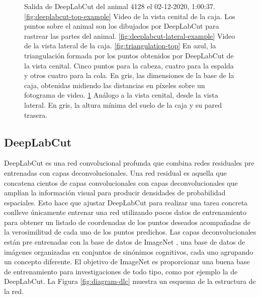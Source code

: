 \begin{figure}[p]
\begin{subfigure}{0.45\textwidth}
    \caption{}
    \label{fig:triangulation-lateral}
  \end{subfigure}
  \caption[Salida de DeepLabCut.]
  {Salida de DeepLabCut del animal 4128 el 02-12-2020, 1:00:37. \ref{fig:deeplabcut-top-example} Video de la vista cenital de la caja. Los puntos sobre el animal son los dibujados por DeepLabCut para rastrear las partes del animal. \ref{fig:deeplabcut-lateral-example} Video de la vista lateral de la caja. \ref{fig:triangulation-top} En azul, la triangulación formada por los puntos obtenidos por DeepLabCut de la vista cenital. Cinco puntos para la cabeza, cuatro para la espalda y otros cuatro para la cola. En gris, las dimensiones de la base de la caja, obtenidas midiendo las distancias en píxeles sobre un fotograma de video. \ref{fig:triangulation-lateral} Análogo a la vista cenital, desde la vista lateral. En gris, la altura mínima del suelo de la caja y su pared trasera.}

  \label{fig:deeplabcut-outputexamples}
\end{figure}

\subsection{DeepLabCut}\label{sec:DeepLabCut}
DeepLabCut es una red convolucional profunda que combina redes residuales pre entrenadas con capas deconvolucionales. Una red residual es aquella que concatena cientos de capas convolucionales con capas deconvolucionales que amplían la información visual para producir densidades de probabilidad espaciales. Esto hace que ajustar DeepLabCut para realizar una tarea concreta conlleve únicamente entrenar una red utilizando pocos datos de entrenamiento para obtener un listado de coordenadas de los puntos deseados acompañadas de la verosimilitud de cada uno de los puntos predichos. Las capas deconvolucionales están pre entrenadas con la base de datos de ImageNet \cite{image-net}, una base de datos de imágenes organizadas en conjuntos de sinónimos cognitivos, cada uno agrupando un concepto diferente. El objetivo de ImageNet es proporcionar una buena base de entrenamiento para investigaciones de todo tipo, como por ejemplo la de DeepLabCut. La Figura \ref{fig:diagram-dlc} muestra un esquema de la estructura de la red.

